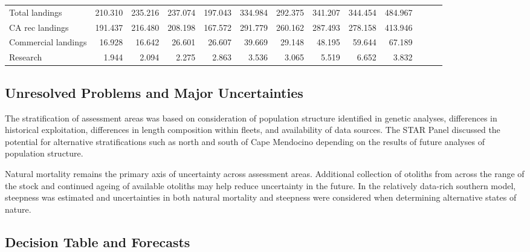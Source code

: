 \documentclass[
  english,
  a4paper,
]{article}
\begin{document}
\begin{table}[H]
{\begin{tabular}[t]{lrrrrrrrrrrrr}
\hspace{1em}Total landings & 210.310 & 235.216 & 237.074 & 197.043 & 334.984 & 292.375 & 341.207 & 344.454 & 484.967 &  &  & \\
\hspace{1em}CA rec landings & 191.437 & 216.480 & 208.198 & 167.572 & 291.779 & 260.162 & 287.493 & 278.158 & 413.946 &  &  & \\
\hspace{1em}Commercial landings & 16.928 & 16.642 & 26.601 & 26.607 & 39.669 & 29.148 & 48.195 & 59.644 & 67.189 &  &  & \\
\hspace{1em}Research & 1.944 & 2.094 & 2.275 & 2.863 & 3.536 & 3.065 & 5.519 & 6.652 & 3.832 &  &  & \\
\bottomrule
\end{tabular}}
\end{table}

\FloatBarrier

\hypertarget{unresolved-problems-and-major-uncertainties}{%
\subsection*{Unresolved Problems and Major Uncertainties}\label{unresolved-problems-and-major-uncertainties}}

The stratification of assessment areas was based on consideration of population structure identified in genetic analyses, differences in historical exploitation, differences in length composition within fleets, and availability of data sources. The STAR Panel discussed the potential for alternative stratifications such as north and south of Cape Mendocino depending on the results of future analyses of population structure.

Natural mortality remains the primary axis of uncertainty across assessment areas. Additional collection of otoliths from across the range of the stock and continued ageing of available otoliths may help reduce uncertainty in the future. In the relatively data-rich southern model, steepness was estimated and uncertainties in both natural mortality and steepness were considered when determining alternative states of nature.

\FloatBarrier

\hypertarget{decision-table-and-forecasts}{%
\subsection*{Decision Table and Forecasts}\label{decision-table-and-forecasts}}
\end{document}
